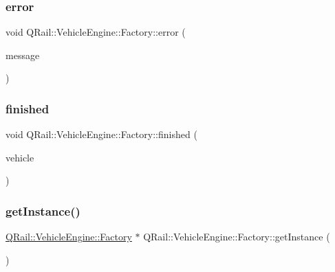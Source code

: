 \subsubsection{\texorpdfstring{error}{error}}
{\footnotesize\ttfamily void Q\+Rail\+::\+Vehicle\+Engine\+::\+Factory\+::error (\begin{DoxyParamCaption}\item[{const Q\+String \&}]{message }\end{DoxyParamCaption})\hspace{0.3cm}{\ttfamily [signal]}}

\mbox{\label{classQRail_1_1VehicleEngine_1_1Factory_a88fae81da6b6ffeb8a28ab6ca3169a00}} 
\subsubsection{\texorpdfstring{finished}{finished}}
{\footnotesize\ttfamily void Q\+Rail\+::\+Vehicle\+Engine\+::\+Factory\+::finished (\begin{DoxyParamCaption}\item[{\mbox{\hyperlink{classQRail_1_1VehicleEngine_1_1Vehicle}{Q\+Rail\+::\+Vehicle\+Engine\+::\+Vehicle}} $\ast$}]{vehicle }\end{DoxyParamCaption})\hspace{0.3cm}{\ttfamily [signal]}}

\mbox{\label{classQRail_1_1VehicleEngine_1_1Factory_a24cf481e93425f2285db3e0a7ce16656}} 
\subsubsection{\texorpdfstring{getInstance()}{getInstance()}}
{\footnotesize\ttfamily \mbox{\hyperlink{classQRail_1_1VehicleEngine_1_1Factory}{Q\+Rail\+::\+Vehicle\+Engine\+::\+Factory}} $\ast$ Q\+Rail\+::\+Vehicle\+Engine\+::\+Factory\+::get\+Instance (\begin{DoxyParamCaption}{ }\end{DoxyParamCaption})\hspace{0.3cm}{\ttfamily [static]}}

